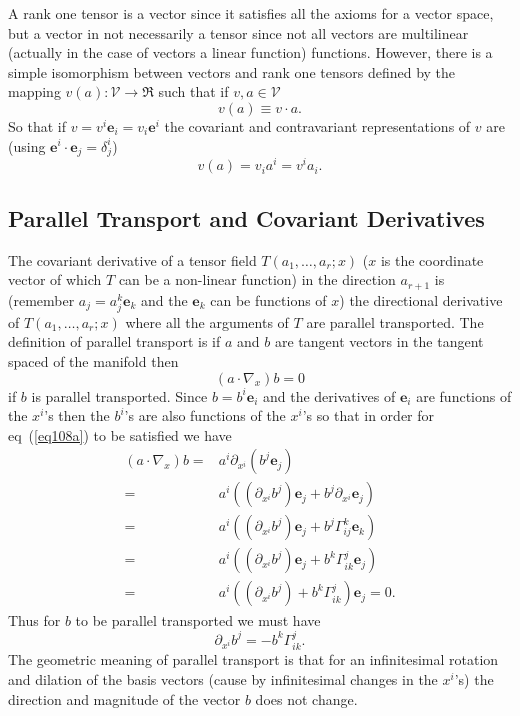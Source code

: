 \documentclass[12pt]{report}
\newcommand{\bm}[1]{\boldsymbol{#1}}
\newcommand{\lp}{\left (}
\newcommand{\rp}{\right )}
\newcommand{\f}[2]{{#1}\lp {#2} \rp}
\newcommand{\paren}[1]{\lp {#1} \rp}
\newcommand{\be}{\begin{equation}}
\newcommand{\ee}{\end{equation}}
\newcommand{\eb}{\bm{e}}
\begin{document}
A rank one tensor is a vector since it satisfies all the axioms for a vector space, but a vector in not necessarily a tensor since not all vectors
are multilinear (actually in the case of vectors a linear function) functions.  However, there is a simple isomorphism between vectors and
rank one tensors defined by the mapping $\f{v}{a}:\mathcal{V}\rightarrow\Re$ such that if $v,a \in\mathcal{V}$
\be
    \f{v}{a} \equiv v\cdot a.
\ee
So that if $v = v^{i}\eb_{i} = v_{i}\eb^{i}$ the covariant and contravariant representations of $v$ are
(using $\eb^{i}\cdot\eb_{j} = \delta^{i}_{j}$)
\be
    \f{v}{a} = v_{i}a^{i} = v^{i}a_{i}.
\ee

\subsection{Parallel Transport and Covariant Derivatives}
The covariant derivative of a tensor field $\f{T}{a_{1},\dots,a_{r};x}$ ($x$ is the coordinate vector of which $T$ can be a non-linear function) in
the direction $a_{r+1}$ is (remember $a_{j} = a_{j}^{k}\eb_{k}$ and the $\eb_{k}$ can be functions of $x$) the directional derivative of
$\f{T}{a_{1},\dots,a_{r};x}$ where all the arguments of $T$ are parallel transported. The definition of parallel transport is if $a$ and $b$ are
tangent vectors in the tangent spaced of the manifold then
\be
    \paren{a\cdot\nabla_{x}}b = 0 \label{eq108a}
\ee
if $b$ is parallel transported.  Since $b = b^{i}\eb_{i}$ and the derivatives of $\eb_{i}$ are functions of the $x^{i}$'s then the $b^{i}$'s are
also functions of the $x^{i}$'s so that in order for eq~(\ref{eq108a}) to be satisfied we have
\begin{align}
    \paren{a\cdot\nabla_{x}}b =& a^{i}\partial_{x^{i}}\paren{b^{j}\eb_{j}} \nonumber \\
                              =& a^{i}\paren{\paren{\partial_{x^{i}}b^{j}}\eb_{j} + b^{j}\partial_{x^{i}}\eb_{j}} \nonumber \\
                              =& a^{i}\paren{\paren{\partial_{x^{i}}b^{j}}\eb_{j} + b^{j}\Gamma_{ij}^{k}\eb_{k}} \nonumber \\
                              =& a^{i}\paren{\paren{\partial_{x^{i}}b^{j}}\eb_{j} + b^{k}\Gamma_{ik}^{j}\eb_{j}}\nonumber \\
                              =& a^{i}\paren{\paren{\partial_{x^{i}}b^{j}} + b^{k}\Gamma_{ik}^{j}}\eb_{j} = 0.
\end{align}
Thus for $b$ to be parallel transported we must have
\be
    \partial_{x^{i}}b^{j} = -b^{k}\Gamma_{ik}^{j}. \label{eq121a}
\ee
The geometric meaning of parallel transport is that for an infinitesimal rotation and dilation of the basis vectors (cause by infinitesimal changes in the $x^{i}$'s) the direction and magnitude of the vector $b$ does not change.
\end{document}
